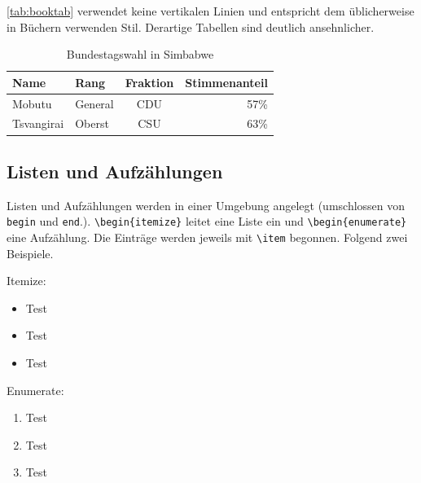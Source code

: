 \autoref{tab:booktab} verwendet keine vertikalen Linien und entspricht dem üblicherweise in Büchern verwenden Stil.
Derartige Tabellen sind deutlich ansehnlicher.

\begin{table}[h]
    \centering
    \begin{tabular} {llcr}
        \toprule
        Name       & Rang    & Fraktion & Stimmenanteil \\
        \midrule
        Mobutu     & General & CDU      & 57\%          \\
        Tsvangirai & Oberst  & CSU      & 63\%          \\
        \bottomrule
    \end{tabular}
    \caption {Bundestagswahl in Simbabwe}
    \label{tab:booktab}
\end{table}

\subsection{Listen und Aufzählungen}

Listen und Aufzählungen werden in einer Umgebung angelegt (umschlossen von \verb|begin| und \verb|end|.).
\verb|\begin{itemize}| leitet eine Liste ein und \verb|\begin{enumerate}| eine Aufzählung.
Die Einträge werden jeweils mit \verb|\item| begonnen.
Folgend zwei Beispiele.

Itemize:
\begin{itemize}
    \item Test
    \item Test
    \item Test
\end{itemize}

Enumerate:
\begin{enumerate}
    \item Test
    \item Test
    \item Test
\end{enumerate}
